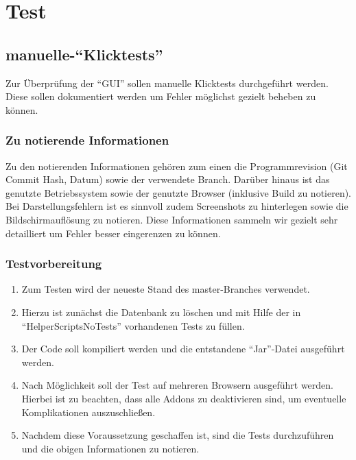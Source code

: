 

\section{Test}
\subsection{manuelle-\enquote{Klicktests}}

Zur Überprüfung der \enquote{GUI} sollen manuelle Klicktests durchgeführt werden.
Diese sollen dokumentiert werden um Fehler möglichst gezielt beheben zu können.\\

\subsubsection*{Zu notierende Informationen}
Zu den notierenden Informationen gehören zum einen die Programmrevision (Git Commit Hash, Datum) sowie der verwendete Branch. Darüber hinaus ist das genutzte Betriebssystem sowie der genutzte Browser (inklusive Build zu notieren). 
Bei Darstellungsfehlern ist es sinnvoll zudem Screenshots zu hinterlegen sowie die Bildschirmauflösung zu notieren.
Diese Informationen sammeln wir gezielt sehr detailliert um Fehler besser eingerenzen zu können.

\subsubsection*{Testvorbereitung}
\begin{enumerate}
    \item Zum Testen wird der neueste Stand des master-Branches verwendet. 
	\item Hierzu ist zunächst die Datenbank zu löschen und mit Hilfe der in \enquote{HelperScriptsNoTests} 		vorhandenen Tests zu füllen.
	\item Der Code soll kompiliert werden und die entstandene \enquote{Jar}-Datei ausgeführt werden.
    \item Nach Möglichkeit soll der Test auf mehreren Browsern ausgeführt werden. Hierbei ist zu beachten, dass alle Addons zu deaktivieren sind, um eventuelle Komplikationen auszuschließen.
    \item Nachdem diese Voraussetzung geschaffen ist, sind die Tests durchzuführen und die obigen Informationen zu notieren.
\end{enumerate}

\pagebreak
